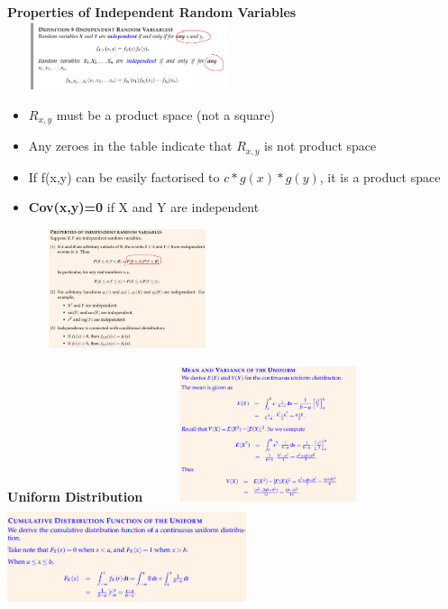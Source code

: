 \documentclass[10pt, landscape]{article}
\begin{document}
\begin{multicols}{4}
\textbf{Properties of Independent Random Variables} \newline
\includegraphics[width=7cm, height=2cm]{indepdent_random_var.png}
\begin{itemize}
  \item $R_{x,y}$ must be a product space (not a square)
  \item Any zeroes in the table indicate that $R_{x,y}$ is not product space
  \item If f(x,y) can be easily factorised to $c*g(x)*g(y)$, it is a product space
  \item \textbf{Cov(x,y)=0} if X and Y are independent
\end{itemize}
\includegraphics[width=7cm, height=3.5cm]{properties_independent_random.png}


\textbf{Uniform Distribution} \newline
\includegraphics[width=7cm, height=4cm]{uniform1.png}
\includegraphics[width=7cm, height=3cm]{uniform2.png}


\end{multicols}
\end{document}
